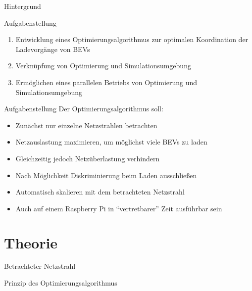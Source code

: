 \documentclass[aspectratio=169]{beamer}
\begin{document}
\begin{frame}{Hintergrund}
	\begin{figure}
		\centering
		
	\end{figure}
\end{frame}


\begin{frame}{Aufgabenstellung}
	\begin{enumerate}
		\item Entwicklung eines Optimierungsalgorithmus zur optimalen 
		Koordination der Ladevorgänge von BEVs
		\item Verknüpfung von Optimierung und Simulationsumgebung
		\item Ermöglichen eines parallelen Betriebs von Optimierung und
		Simulationsumgebung
	\end{enumerate}
\end{frame}


\begin{frame}{Aufgabenstellung}
	Der Optimierungsalgorithmus soll:
	\begin{itemize}
		\item Zunächst nur einzelne Netzstrahlen betrachten
		\item Netzauslastung maximieren, um möglichst viele BEVs zu laden
		\item Gleichzeitig jedoch Netzüberlastung verhindern
		\item Nach Möglichkeit Diskriminierung beim Laden ausschließen
		\item Automatisch skalieren mit dem betrachteten Netzstrahl
		\item Auch auf einem Raspberry Pi in \enquote{vertretbarer} Zeit 
		ausführbar sein
	\end{itemize}
\end{frame}

\section{Theorie}

\begin{frame}{Betrachteter Netzstrahl}
	\begin{figure}
		\centering
		
	\end{figure}
\end{frame}


\begin{frame}{Prinzip des Optimierungsalgorithmus}
	\begin{figure}
		\centering
		
	\end{figure}
\end{frame}
\end{document}
